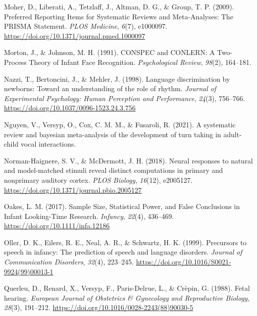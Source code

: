 \documentclass[
  man,mask,floatsintext]{apa6}
\newlength{\cslhangindent}
\newlength{\cslentryspacingunit} %
\newenvironment{CSLReferences}[2] %
 {%
  \setlength{\parindent}{0pt}
  \ifodd #1
  \let\oldpar\par
  \def\par{\hangindent=\cslhangindent\oldpar}
  \fi
  \setlength{\parskip}{#2\cslentryspacingunit}
 }%
 {}
\begin{document}
\begin{CSLReferences}{1}{0}
\leavevmode{}%
Moher, D., Liberati, A., Tetzlaff, J., Altman, D. G., \& Group, T. P. (2009). Preferred {Reporting} {Items} for {Systematic} {Reviews} and {Meta}-{Analyses}: {The} {PRISMA} {Statement}. \emph{PLOS Medicine}, \emph{6}(7), e1000097. \url{https://doi.org/10.1371/journal.pmed.1000097}

\leavevmode{}%
Morton, J., \& Johnson, M. H. (1991). {CONSPEC} and {CONLERN}: {A} {Two}-{Process} {Theory} of {Infant} {Face} {Recognition}. \emph{Psychological Review}, \emph{98}(2), 164--181.

\leavevmode{}%
Nazzi, T., Bertoncini, J., \& Mehler, J. (1998). Language discrimination by newborns: {Toward} an understanding of the role of rhythm. \emph{Journal of Experimental Psychology: Human Perception and Performance}, \emph{24}(3), 756--766. \url{https://doi.org/10.1037/0096-1523.24.3.756}

\leavevmode{}%
Nguyen, V., Versyp, O., Cox, C. M. M., \& Fusaroli, R. (2021). A systematic review and bayesian meta-analysis of the development of turn taking in adult-child vocal interactions.

\leavevmode{}%
Norman-Haignere, S. V., \& McDermott, J. H. (2018). Neural responses to natural and model-matched stimuli reveal distinct computations in primary and nonprimary auditory cortex. \emph{PLOS Biology}, \emph{16}(12), e2005127. \url{https://doi.org/10.1371/journal.pbio.2005127}

\leavevmode{}%
Oakes, L. M. (2017). Sample {Size}, {Statistical} {Power}, and {False} {Conclusions} in {Infant} {Looking}-{Time} {Research}. \emph{Infancy}, \emph{22}(4), 436--469. \url{https://doi.org/10.1111/infa.12186}

\leavevmode{}%
Oller, D. K., Eilers, R. E., Neal, A. R., \& Schwartz, H. K. (1999). Precursors to speech in infancy: {The} prediction of speech and language disorders. \emph{Journal of Communication Disorders}, \emph{32}(4), 223--245. \url{https://doi.org/10.1016/S0021-9924(99)00013-1}

\leavevmode{}%
Querleu, D., Renard, X., Versyp, F., Paris-Delrue, L., \& Crèpin, G. (1988). Fetal hearing. \emph{European Journal of Obstetrics \& Gynecology and Reproductive Biology}, \emph{28}(3), 191--212. \url{https://doi.org/10.1016/0028-2243(88)90030-5}


\end{CSLReferences}
\end{document}
